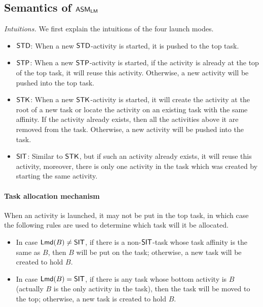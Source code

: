 

\subsection{Semantics of $\textsf{ASM}_\textsf{LM}$} \label{sect:semlmamass}



%
\noindent\emph{Intuitions.}  We first explain the intuitions of the four launch modes. 

\begin{itemize}
	\item  $\mathsf{STD}$: When a new $\mathsf{STD}$-activity is started, it is pushed to the top task. 
	\item $\mathsf{STP}$: When a new $\mathsf{STP}$-activity is started, if the activity is already at the top of the top task, it will reuse this activity. Otherwise, a new activity will be pushed into the top task.
	\item $\mathsf{STK}$: When a new $\mathsf{STK}$-activity is started, it will create the activity at the root of a new task or locate the activity on an existing task with the same affinity. If the activity already exists, then all the activities above it are removed from the task. Otherwise, a new activity will be pushed into the task.
	\item $\mathsf{SIT}$: 
	Similar to $\mathsf{STK}$, but if such an activity already exists, it will reuse this activity, moreover, there is only one activity in the task which was created by starting the same activity.
\end{itemize}




\paragraph*{Task allocation mechanism}
When an activity is launched, it may not be put in the top task, in which case  
the following rules are used to determine which task will it be allocated. 
\begin{itemize}
	\item In case ${\sf Lmd}(B) \neq \mathsf{SIT}$, if there is a non-$\mathsf{SIT}$-task whose task affinity is the same as $B$, then $B$ will be put on the task; otherwise, a new task will be created to hold $B$.
	
	\item In case ${\sf Lmd}(B) = \mathsf{SIT}$,    if there is any task whose bottom activity is $B$ (actually $B$ is the only activity in the task), then the task will be moved to the top; otherwise, a new task is created to hold $B$.
\end{itemize}

